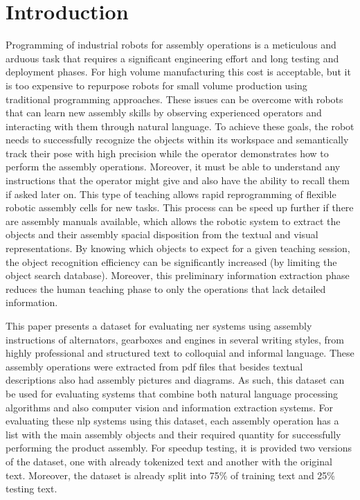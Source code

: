 \section{Introduction}\label{sec:introduction}

Programming of industrial robots for assembly operations is a meticulous and arduous task that requires a significant engineering effort and long testing and deployment phases. For high volume manufacturing this cost is acceptable, but it is too expensive to repurpose robots for small volume production using traditional programming approaches. These issues can be overcome with robots that can learn new assembly skills by observing experienced operators and interacting with them through natural language. To achieve these goals, the robot needs to successfully recognize the objects within its workspace and semantically track their pose with high precision while the operator demonstrates how to perform the assembly operations. Moreover, it must be able to understand any instructions that the operator might give and also have the ability to recall them if asked later on. This type of teaching allows rapid reprogramming of flexible robotic assembly cells for new tasks. This process can be speed up further if there are assembly manuals available, which allows the robotic system to extract the objects and their assembly spacial disposition from the textual and visual representations. By knowing which objects to expect for a given teaching session, the object recognition efficiency can be significantly increased (by limiting the object search database). Moreover, this preliminary information extraction phase reduces the human teaching phase to only the operations that lack detailed information.

This paper presents a dataset for evaluating \gls{ner} systems using assembly instructions of alternators, gearboxes and engines in several writing styles, from highly professional and structured text to colloquial and informal language. These assembly operations were extracted from \gls{pdf} files that besides textual descriptions also had assembly pictures and diagrams. As such, this dataset can be used for evaluating systems that combine both natural language processing algorithms and also computer vision and information extraction systems. For evaluating these \gls{nlp} systems using this dataset, each assembly operation has a list with the main assembly objects and their required quantity for successfully performing the product assembly. For speedup testing, it is provided two versions of the dataset, one with already tokenized text and another with the original text. Moreover, the dataset is already split into 75\% of training text and 25\% testing text.

